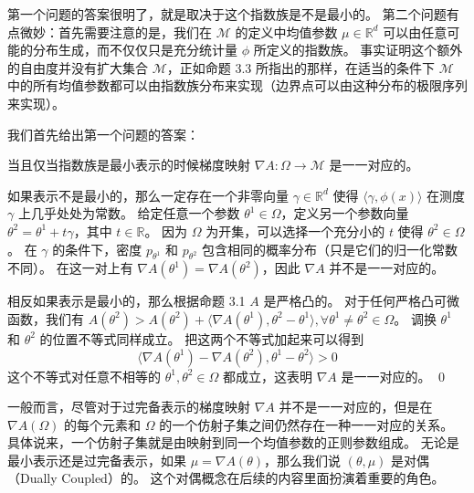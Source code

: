 第一个问题的答案很明了，就是取决于这个指数族是不是最小的。
第二个问题有点微妙：首先需要注意的是，我们在 $\mathcal{M}$ 的定义中均值参数 $\mu \in \mathbb{R}^d$ 可以由任意可能的分布生成，而不仅仅只是充分统计量 $\phi$ 所定义的指数族。
事实证明这个额外的自由度并没有扩大集合 $\mathcal{M}$，正如命题 3.3 所指出的那样，在适当的条件下 $\mathcal{M}$ 中的所有均值参数都可以由指数族分布来实现（边界点可以由这种分布的极限序列来实现）。

我们首先给出第一个问题的答案：

\begin{tcolorbox}
\begin{prop}

当且仅当指数族是最小表示的时候梯度映射 $\nabla A: \Omega \rightarrow \mathcal{M}$ 是一一对应的。

\end{prop}
\end{tcolorbox}

\analysis[证明]
如果表示不是最小的，那么一定存在一个非零向量 $\gamma \in \mathbb{R}^d$ 使得 $\langle \gamma, \phi(x) \rangle$ 在测度 $\gamma$ 上几乎处处为常数。
给定任意一个参数 $\theta^1 \in \Omega$，定义另一个参数向量 $\theta^2 = \theta^1 + t\gamma$，其中 $t \in \mathbb{R}$。
因为 $\Omega$ 为开集，可以选择一个充分小的 $t$ 使得 $\theta^2 \in \Omega$。
在 $\gamma$ 的条件下，密度 $p_{\theta^1}$ 和 $p_{\theta^2}$ 包含相同的概率分布（只是它们的归一化常数不同）。
在这一对上有 $\nabla A(\theta^1) = \nabla A(\theta^2)$，因此 $\nabla A$ 并不是一一对应的。

相反如果表示是最小的，那么根据命题 3.1 $A$ 是严格凸的。
对于任何严格凸可微函数，我们有 $A(\theta^2) > A(\theta^2) + \langle \nabla A(\theta^1), \theta^2-\theta^1 \rangle, \forall \theta^1 \neq \theta^2 \in \Omega$。
调换 $\theta^1$ 和 $\theta^2$ 的位置不等式同样成立。
把这两个不等式加起来可以得到
$$\langle \nabla A(\theta^1) - \nabla A(\theta^2), \theta^1 - \theta^2 \rangle > 0$$
这个不等式对任意不相等的 $\theta^1, \theta^2 \in \Omega$ 都成立，这表明 $\nabla A$ 是一一对应的。
\qed

一般而言，尽管对于过完备表示的梯度映射 $\nabla A$ 并不是一一对应的，但是在 $\nabla A(\Omega)$ 的每个元素和 $\Omega$ 的一个仿射子集之间仍然存在一种一一对应的关系。
具体说来，一个仿射子集就是由映射到同一个均值参数的正则参数组成。
无论是最小表示还是过完备表示，如果 $\mu = \nabla A(\theta)$，那么我们说 $(\theta, \mu)$ 是对偶（Dually Coupled）的。
这个对偶概念在后续的内容里面扮演着重要的角色。

